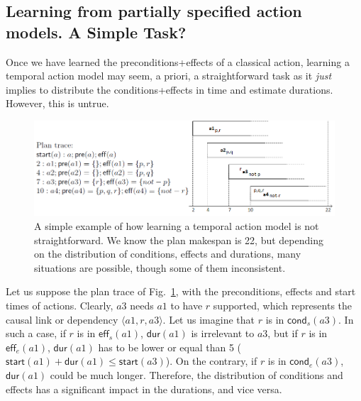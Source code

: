 \documentclass[runningheads]{llncs}
\newcommand{\tup}[1]{{\langle #1 \rangle}}
\newcommand{\pre}{\mathsf{pre}}    %
\newcommand{\eff}{\mathsf{eff}}    %
\newcommand{\cond}{\mathsf{cond}}  %
\newcommand{\dur}{\mathsf{dur}}    %
\newcommand{\start}{\mathsf{start}}%
\begin{document}
\subsection{Learning from partially specified action models. A Simple Task?}

Once we have learned the preconditions+effects of a classical action, learning a temporal action model may seem, a priori, a straightforward task as it \emph{just} implies to distribute the conditions+effects in time and estimate durations. However, this is untrue.

\begin{figure}


\center \includegraphics[width=12cm]{ejemploacciones2.png}
\caption{A simple example of how learning a temporal action model is not straightforward. We know the plan makespan is 22, but depending on the distribution of conditions, effects and durations, many situations are possible, though some of them inconsistent.}
\label{fig:exampleplantrace}
\end{figure}


Let us suppose the plan trace of Fig.~\ref{fig:exampleplantrace}, with the preconditions, effects and start times of actions. Clearly, $a3$ needs $a1$ to have $r$ supported, which represents the causal link or dependency $\tup{a1,r,a3}$. Let us imagine that $r$ is in $\cond_s(a3)$. In such a case, if $r$ is in $\eff_s(a1)$, $\dur(a1)$ is irrelevant to $a3$, but if $r$ is in $\eff_e(a1)$, $\dur(a1)$ has to be lower or equal than 5 ($\start(a1)+\dur(a1) \leq \start(a3)$). On the contrary, if $r$ is in $\cond_e(a3)$, $\dur(a1)$ could be much longer. Therefore, the distribution of conditions and effects has a significant impact in the durations, and vice versa.
\end{document}
